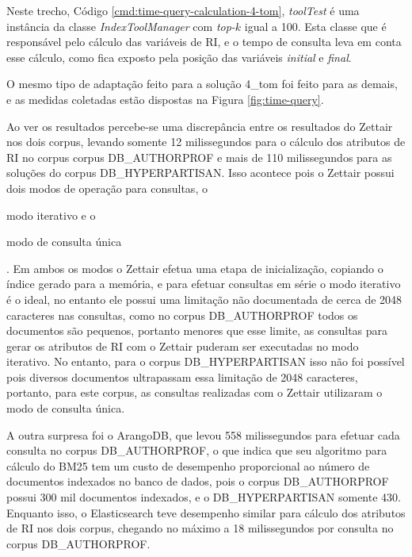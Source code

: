 
			Neste trecho, Código \ref{cmd:time-query-calculation-4-tom}, \textit{toolTest} é uma instância da classe \textit{IndexToolManager} com \textit{top-$k$} igual a 100. 
			Esta classe que é responsável pelo cálculo das variáveis de RI, e o tempo de consulta leva em conta esse cálculo, como fica exposto pela posição das variáveis \textit{initial} e \textit{final}.

			O mesmo tipo de adaptação feito para a solução 4\_tom foi feito para as demais, e as medidas coletadas estão dispostas na Figura \ref{fig:time-query}.

			


			Ao ver os resultados percebe-se uma discrepância entre os resultados do Zettair nos dois corpus, levando somente 12 milissegundos para o cálculo dos atributos de RI no corpus  corpus DB\_AUTHORPROF e mais de 110 milissegundos para as soluções do corpus DB\_HYPERPARTISAN.
			Isso acontece pois o Zettair possui dois modos de operação para consultas, o 
			\begin{enumerate*}[label=(\alph*)]
				\item modo iterativo e o 
				\item modo de consulta única
			\end{enumerate*}.
			Em ambos os modos o Zettair efetua uma etapa de inicialização, copiando o índice gerado para a memória, e para efetuar consultas em série o modo iterativo é o ideal, no entanto ele possui uma limitação não documentada de cerca de 2048 caracteres nas consultas, como no corpus DB\_AUTHORPROF todos os documentos são pequenos, portanto menores que esse limite, as consultas para gerar os atributos de RI com o Zettair puderam ser executadas no modo iterativo.
			No entanto, para o corpus DB\_HYPERPARTISAN isso não foi possível pois diversos  documentos ultrapassam essa limitação de 2048 caracteres, portanto, para este corpus, as consultas realizadas com o Zettair utilizaram o modo de consulta única.

			A outra surpresa foi o ArangoDB, que levou 558 milissegundos para efetuar cada consulta no corpus DB\_AUTHORPROF, o que indica que seu algoritmo para cálculo do BM25 tem um custo de desempenho proporcional ao número de documentos indexados no banco de dados, pois o corpus DB\_AUTHORPROF possui 300 mil documentos indexados, e o DB\_HYPERPARTISAN somente 430.
			Enquanto isso, o Elasticsearch teve desempenho similar para cálculo dos atributos de RI nos dois corpus, chegando no máximo a 18 milissegundos por consulta no corpus DB\_AUTHORPROF.

